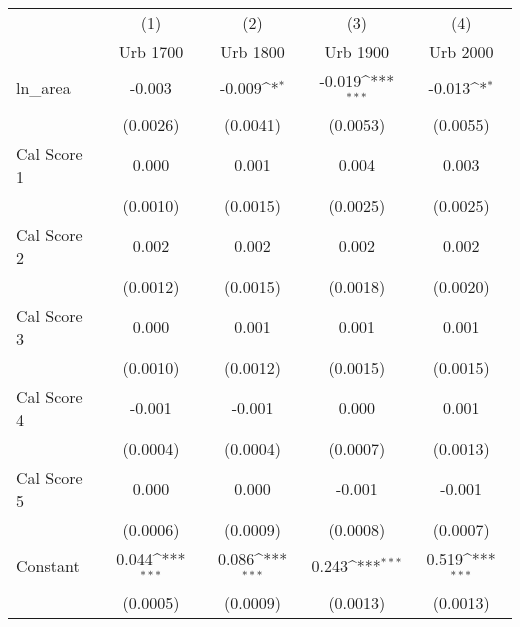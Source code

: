 {
\def\sym#1{\ifmmode^{#1}\else\(^{#1}\)\fi}
\begin{tabular}{l*{4}{c}}
\toprule
                    &\multicolumn{1}{c}{(1)}&\multicolumn{1}{c}{(2)}&\multicolumn{1}{c}{(3)}&\multicolumn{1}{c}{(4)}\\
                    &\multicolumn{1}{c}{Urb 1700}&\multicolumn{1}{c}{Urb 1800}&\multicolumn{1}{c}{Urb 1900}&\multicolumn{1}{c}{Urb 2000}\\
\midrule
ln\_area             &      -0.003         &      -0.009\sym{*}  &      -0.019\sym{***}&      -0.013\sym{*}  \\
                    &    (0.0026)         &    (0.0041)         &    (0.0053)         &    (0.0055)         \\
\addlinespace
Cal Score 1         &       0.000         &       0.001         &       0.004         &       0.003         \\
                    &    (0.0010)         &    (0.0015)         &    (0.0025)         &    (0.0025)         \\
\addlinespace
Cal Score 2         &       0.002         &       0.002         &       0.002         &       0.002         \\
                    &    (0.0012)         &    (0.0015)         &    (0.0018)         &    (0.0020)         \\
\addlinespace
Cal Score 3         &       0.000         &       0.001         &       0.001         &       0.001         \\
                    &    (0.0010)         &    (0.0012)         &    (0.0015)         &    (0.0015)         \\
\addlinespace
Cal Score 4         &      -0.001         &      -0.001         &       0.000         &       0.001         \\
                    &    (0.0004)         &    (0.0004)         &    (0.0007)         &    (0.0013)         \\
\addlinespace
Cal Score 5         &       0.000         &       0.000         &      -0.001         &      -0.001         \\
                    &    (0.0006)         &    (0.0009)         &    (0.0008)         &    (0.0007)         \\
\addlinespace
Constant            &       0.044\sym{***}&       0.086\sym{***}&       0.243\sym{***}&       0.519\sym{***}\\
                    &    (0.0005)         &    (0.0009)         &    (0.0013)         &    (0.0013)         \\

\end{tabular}}
